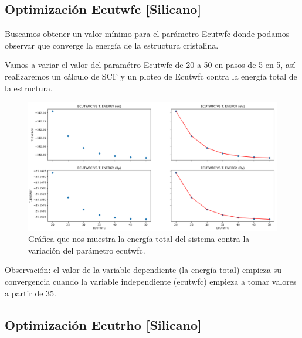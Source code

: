 
\newpage

\subsection{Optimización Ecutwfc [Silicano]}

\vspace{0.5cm}

Buscamos obtener un valor mínimo para el parámetro Ecutwfc donde podamos observar 
que converge la energía de la estructura cristalina.

\vspace{0.5cm}

Vamos a variar el valor del paramétro Ecutwfc de 20 a 50 en pasos de 5 en 5, así realizaremos un cálculo de
SCF y un ploteo de Ecutwfc contra la energía total de la estructura.

\vspace{0.5cm}

\begin{figure}[H]
    \centering
    \includegraphics[scale=0.32]{images_silicano/Ecutwfc_vs_Energy.png}
    \caption{Gráfica que nos muestra la energía total del sistema contra la variación del parámetro ecutwfc.}
\end{figure}


Observación: el valor de la variable dependiente (la energía total) empieza su convergencia cuando 
la variable independiente (ecutwfc) empieza a tomar valores a partir de 35.



\newpage

\subsection{Optimización Ecutrho [Silicano]}

